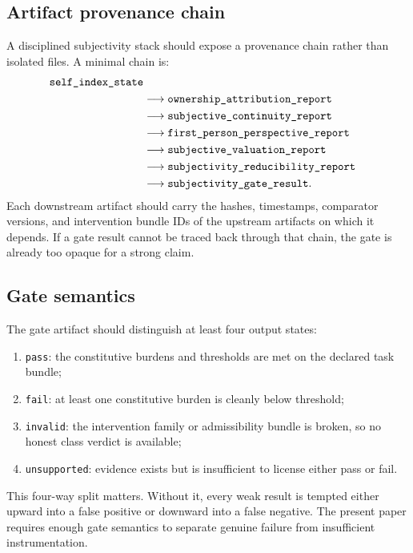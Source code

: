 \documentclass[11pt,a4paper]{article}
\theoremstyle{definition}
\begin{document}
\subsection{Artifact provenance chain}
A disciplined subjectivity stack should expose a provenance chain rather than isolated files. A minimal chain is:
\[
\begin{aligned}
\texttt{\detokenize{self_}\allowbreak{}\detokenize{index_}\allowbreak{}\detokenize{state}}
\\
&\longrightarrow
\texttt{\detokenize{ownershi}\allowbreak{}\detokenize{p_}\allowbreak{}\detokenize{attribut}\allowbreak{}\detokenize{ion_}\allowbreak{}\detokenize{report}}
\\
&\longrightarrow
\texttt{\detokenize{subjecti}\allowbreak{}\detokenize{ve_}\allowbreak{}\detokenize{continui}\allowbreak{}\detokenize{ty_}\allowbreak{}\detokenize{report}}
\\
&\longrightarrow
\texttt{\detokenize{first_}\allowbreak{}\detokenize{person_}\allowbreak{}\detokenize{perspect}\allowbreak{}\detokenize{ive_}\allowbreak{}\detokenize{report}}
\\
&\longrightarrow
\texttt{\detokenize{subjecti}\allowbreak{}\detokenize{ve_}\allowbreak{}\detokenize{valuatio}\allowbreak{}\detokenize{n_}\allowbreak{}\detokenize{report}}
\\
&\longrightarrow
\texttt{\detokenize{subjecti}\allowbreak{}\detokenize{vity_}\allowbreak{}\detokenize{reducibi}\allowbreak{}\detokenize{lity_}\allowbreak{}\detokenize{report}}
\\
&\longrightarrow
\texttt{\detokenize{subjecti}\allowbreak{}\detokenize{vity_}\allowbreak{}\detokenize{gate_}\allowbreak{}\detokenize{result}}.
\end{aligned}
\]
Each downstream artifact should carry the hashes, timestamps, comparator versions, and intervention bundle IDs of the upstream artifacts on which it depends. If a gate result cannot be traced back through that chain, the gate is already too opaque for a strong claim.

\subsection{Gate semantics}
The gate artifact should distinguish at least four output states:
\begin{enumerate}[leftmargin=1.5em]
\item \texttt{pass}: the constitutive burdens and thresholds are met on the declared task bundle;
\item \texttt{fail}: at least one constitutive burden is cleanly below threshold;
\item \texttt{invalid}: the intervention family or admissibility bundle is broken, so no honest class verdict is available;
\item \texttt{unsupported}: evidence exists but is insufficient to license either pass or fail.
\end{enumerate}
This four-way split matters. Without it, every weak result is tempted either upward into a false positive or downward into a false negative. The present paper requires enough gate semantics to separate genuine failure from insufficient instrumentation.
\end{document}
